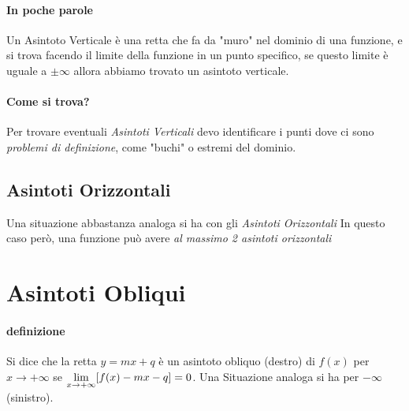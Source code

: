 \documentclass[12pt, a4paper, openany]{book}
\begin{document}
\paragraph*{In poche parole} Un Asintoto Verticale è una retta che fa da "muro" nel dominio di una funzione, e si trova facendo il limite della funzione in un punto specifico, se questo limite è uguale a $\pm \infty$ allora abbiamo trovato un asintoto verticale.

\paragraph*{Come si trova?} Per trovare eventuali \emph{Asintoti Verticali} devo identificare i punti dove ci sono \emph{problemi di definizione},
come "buchi" o estremi del dominio.

\subsection*{Asintoti Orizzontali}
Una situazione abbastanza analoga si ha con gli \emph{Asintoti Orizzontali}
In questo caso però, una funzione può avere \emph{al massimo 2 asintoti orizzontali}

\section{Asintoti Obliqui}
\paragraph*{definizione}{ %
	Si dice che la retta $y=mx + q$ è un asintoto obliquo (destro) di $f(x)$ per $x \to +\infty$ se
	$\underset{x \to +\infty}{\lim} [f(x)-mx-q]=0$.
	Una Situazione analoga si ha per $-\infty $ (sinistro).
}
\end{document}
